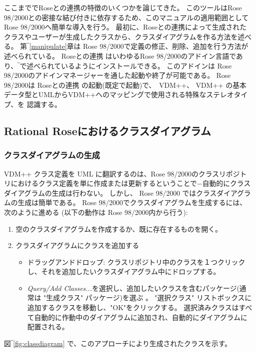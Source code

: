 \documentclass[\pformat,12pt]{jarticle}
\newcommand{\vdmpp}{VDM++}
\newcommand{\link}{Roseとの連携}
\newcommand{\rose}{Rose 98/2000}
\begin{document}
ここまでで\link{}の特徴のいくつかを論じてきた。
このツールは\rose{}との密接な結び付きに依存するため、このマニュアルの適用範囲として\rose{}へ簡単な導入を行う。
最初に、\link{}によって生成されたクラスやユーザーが生成したクラスから、クラスダイアグラムを作る方法を述べる。
第‾\ref{manipulate}章は \rose{}で定義の修正、削除、追加を行う方法が述べられている。
 \link{} はいわゆる\rose{}のアドイン言語であり、‾\cite{InstallPPMan-CSK}で述べられているようにインストールできる。 
このアドインは \rose{}のアドインマネージャーを通した起動や終了が可能である。
 \rose{}は \link{} の起動(既定で起動)で、　\vdmpp{}、 \vdmpp{} の基本データ型とUMLから\vdmpp{}へのマッピングで使用される特殊なステレオタイプ、を 認識する。

\subsection{Rational Roseにおけるクラスダイアグラム} \label{diagrams}
  
\subsubsection*{クラスダイアグラムの生成}

 \vdmpp{} クラス定義を UML に翻訳するのは、\rose{}のクラスリポジトリにおけるクラス定義を単に作成または更新するということで−自動的にクラスダイアグラムの生成は行わない。
しかし、 \rose{} ではクラスダイアグラムの生成は簡単である。
 \rose{}でクラスダイアグラムを生成するには、次のように進める (以下の動作は \rose{}内から行う):


\begin{enumerate}  
\item 空のクラスダイアグラムを作成するか、既に存在するものを開く。
\item クラスダイアグラムにクラスを追加する 
\begin{itemize} 
\item ドラッグアンドドロップ: クラスリポジトリ中のクラスを１つクリックし、それを追加したいクラスダイアグラム中にドロップする。
\item  {\it Query/Add Classes...}を選択し、追加したいクラスを含むパッケージ(通常は "生成クラス" パッケージ)を選ぶ 。   
 "選択クラス" リストボックスに追加するクラスを移動し、"OK"をクリックする。
選択済みクラスはすべて自動的に作動中のダイアグラムに追加され、自動的にダイアグラムに配置される。
\end{itemize}
\end{enumerate}

図‾\ref{fig:classdiagram} で、このアプローチにより生成されたクラスを示す。
\end{document}
